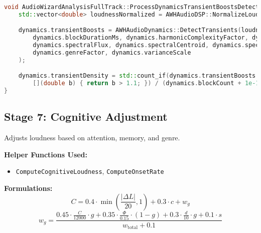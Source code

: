 \documentclass[11pt]{article}
\begin{document}
\begin{lstlisting}[language=C++]
void AudioWizardAnalysisFullTrack::ProcessDynamicsTransientBoostsDetection(FullTrackDataDynamics& dynamics) {
	std::vector<double> loudnessNormalized = AWHAudioDSP::NormalizeLoudness(dynamics.adaptedLoudness, dynamics.blockDurationMs, 500.0);

	dynamics.transientBoosts = AWHAudioDynamics::DetectTransients(loudnessNormalized,
		dynamics.blockDurationMs, dynamics.harmonicComplexityFactor, dynamics.maskingFactor,
		dynamics.spectralFlux, dynamics.spectralCentroid, dynamics.spectralFlatness,
		dynamics.genreFactor, dynamics.varianceScale
	);

	dynamics.transientDensity = std::count_if(dynamics.transientBoosts.begin(), dynamics.transientBoosts.end(),
		[](double b) { return b > 1.1; }) / (dynamics.blockCount + 1e-12);
}
\end{lstlisting}

\subsection{Stage 7: Cognitive Adjustment}
Adjusts loudness based on attention, memory, and genre.

\textbf{Helper Functions Used:}
\begin{itemize}
  \item \texttt{ComputeCognitiveLoudness}, \texttt{ComputeOnsetRate}
\end{itemize}

\textbf{Formulations:}
\begin{equation}
C = 0.4 \cdot \min\left(\frac{|\Delta L|}{20}, 1\right) + 0.3 \cdot c + w_g
\end{equation}
\begin{equation}
w_g = \frac{0.45 \cdot \frac{C}{12000} \cdot g + 0.35 \cdot \frac{\Phi}{0.15} \cdot (1 - g) + 0.3 \cdot \frac{d}{10} \cdot g + 0.1 \cdot s}{w_{\text{total}} + 0.1}
\end{equation}
\end{document}
